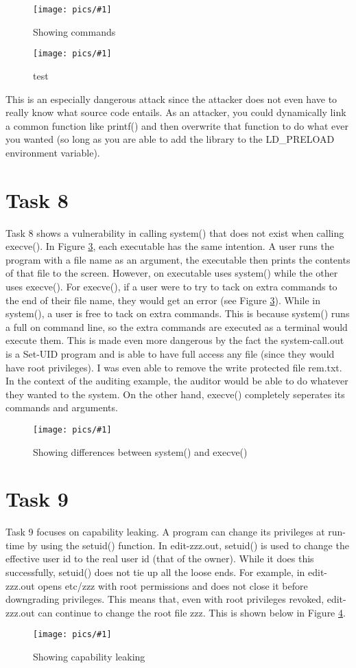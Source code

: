 \documentclass[11pt]{article}
\newcommand{\fig}[2]{ 
\begin{figure}[h]
	\centering
	\caption{#2}
	\texttt{[image: pics/\#1]}
	\label{fig:#1}
\end{figure} 
}
\begin{document}
\fig{task7.4}{Showing commands}
\fig{task7.5}{test}

This is an especially dangerous attack since the attacker does not even have to really know what source code entails.
As an attacker, you could dynamically link a common function like printf() and then overwrite that function to do what ever you wanted (so long as you are able to add the library to the LD\_PRELOAD environment variable).

\newpage

\section*{Task 8}

Task 8 shows a vulnerability in calling system() that does not exist when calling execve(). In Figure \ref{fig:task8}, each executable has the same intention.
A user runs the program with a file name as an argument, the executable then prints the contents of that file to the screen.
However, on executable uses system() while the other uses execve().
For execve(), if a user were to try to tack on extra commands to the end of their file name, they would get an error (see Figure \ref{fig:task8}).
While in system(), a user is free to tack on extra commands. 
This is because system() runs a full on command line, so the extra commands are executed as a terminal would execute them. 
This is made even more dangerous by the fact the system-call.out is a Set-UID program and is able to have full access any file (since they would have root privileges). 
I was even able to remove the write protected file rem.txt.
In the context of the auditing example, the auditor would be able to do whatever they wanted to the system. On the other hand, execve() completely seperates its commands and arguments.

\fig{task8}{Showing differences between system() and execve()}

\newpage

\section*{Task 9}

Task 9 focuses on capability leaking. 
A program can change its privileges at run-time by using the setuid() function. 
In edit-zzz.out, setuid() is used to change the effective user id to the real user id (that of the owner).
While it does this successfully, setuid() does not tie up all the loose ends.
For example, in edit-zzz.out opens etc/zzz with root permissions and does not close it before downgrading privileges.
This means that, even with root privileges revoked, edit-zzz.out can continue to change the root file zzz.
This is shown below in Figure \ref{fig:task9}.

\fig{task9}{Showing capability leaking}

\newpage
\end{document}

